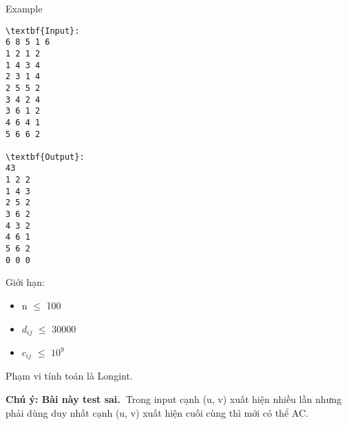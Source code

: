 Example
\begin{verbatim}
\textbf{Input}:
6 8 5 1 6
1 2 1 2
1 4 3 4
2 3 1 4
2 5 5 2
3 4 2 4
3 6 1 2
4 6 4 1
5 6 6 2

\textbf{Output}:
43
1 2 2
1 4 3
2 5 2
3 6 2
4 3 2
4 6 1
5 6 2
0 0 0

\end{verbatim}

Giới hạn:
\begin{itemize}
	\item n  $\le$  100
	\item $d_{ij}$  $\le$  30000
	\item $c_{ij}$  $\le$  $10^{9}$
\end{itemize}

Phạm vi tính toán là Longint.

\textbf{Chú ý: Bài này test sai. }Trong input cạnh (u, v) xuất hiện nhiều lần nhưng phải dùng duy nhất cạnh (u, v) xuất hiện cuối cùng thì mới có thể AC.
